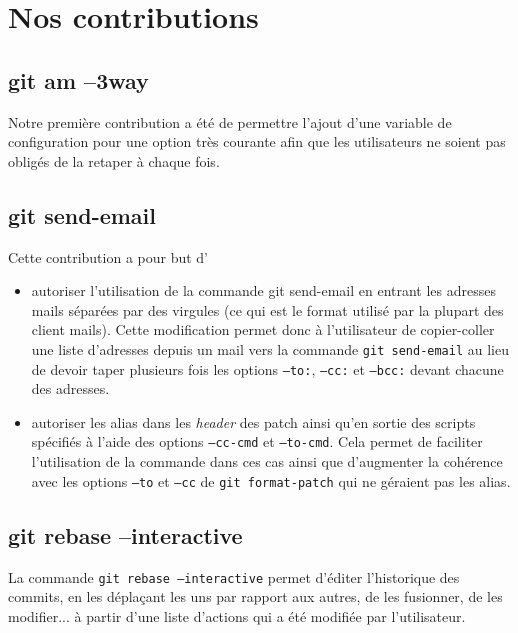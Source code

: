 \documentclass[a4paper, 12pt]{article}
\newcommand{\gitcmd}[1]{\texttt{#1}}
\newcommand{\tech}[1]{\emph{#1}}
\newenvironment{parremil}{%
  \color{red}
}{%
  \color{white}
}
\begin{document}
\section{Nos contributions}

\subsection{git am --3way}

Notre première contribution a été de permettre l'ajout d'une variable de configuration pour une option très courante afin que les utilisateurs ne soient pas obligés de la retaper à chaque fois.

\subsection{git send-email}

\begin{parremil}
Cette contribution a pour but d'

\begin{itemize}
\item autoriser l'utilisation de la commande git send-email en entrant
  les adresses mails séparées par des virgules (ce qui est le format
  utilisé par la plupart des client mails). Cette modification permet
  donc à l'utilisateur de copier-coller une liste d'adresses depuis un
  mail vers la commande \gitcmd{git send-email} au lieu de devoir
  taper plusieurs fois les options \gitcmd{--to:}, \gitcmd{--cc:} et
  \gitcmd{--bcc:} devant chacune des adresses. 
\item autoriser les alias dans les \tech{header} des patch ainsi qu'en
  sortie des scripts spécifiés à l'aide des options \gitcmd{--cc-cmd}
  et \gitcmd{--to-cmd}. Cela permet de faciliter l'utilisation de la
  commande dans ces cas ainsi que d'augmenter la cohérence avec
  les options \gitcmd{--to} et \gitcmd{--cc} de \gitcmd{git format-patch} 
  qui ne géraient pas les alias.
\end{itemize}
\end{parremil}

\subsection{git rebase --interactive}

La commande \gitcmd{git rebase --interactive} permet d'éditer l'historique des commits, en les déplaçant les uns par rapport aux autres, de les fusionner, de les modifier... à partir d'une liste d'actions qui a été modifiée par l'utilisateur.
\end{document}
